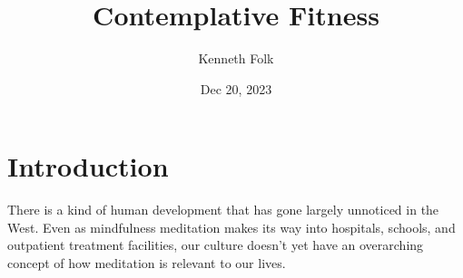 \documentclass[a5paper,10pt,english]{book}
\title{Contemplative Fitness}
\date{Dec 20, 2023}
\author{Kenneth Folk}
\renewcommand{\releasename}{29d6cce}
\begin{document}
\pagestyle{empty}

\makeatletter%
%
\makeatother%

\pagestyle{plain}
\sphinxtableofcontents
\pagestyle{normal}
\label{\detokenize{index::doc}}


\frontmatter
\bgroup
\def\thesection{\arabic{section} }

\sphinxstepscope


\chapter{Introduction}
\label{\detokenize{front-intro:introduction}}\label{\detokenize{front-intro::doc}}
\setcounter{section}{0}

\sphinxAtStartPar
There is a kind of human development that has gone largely unnoticed in
the West. Even as mindfulness meditation makes its way into hospitals,
schools, and outpatient treatment facilities, our culture doesn’t yet
have an over\sphinxhyphen{}arching concept of how meditation is relevant to our lives.
\end{document}
